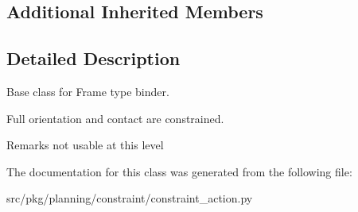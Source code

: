 \subsection*{Additional Inherited Members}


\subsection{Detailed Description}
Base class for Frame type binder. 

Full orientation and contact are constrained. \begin{DoxyRemark}{Remarks}
not usable at this level 
\end{DoxyRemark}


The documentation for this class was generated from the following file\+:\begin{DoxyCompactItemize}
\item 
src/pkg/planning/constraint/constraint\+\_\+action.\+py\end{DoxyCompactItemize}
